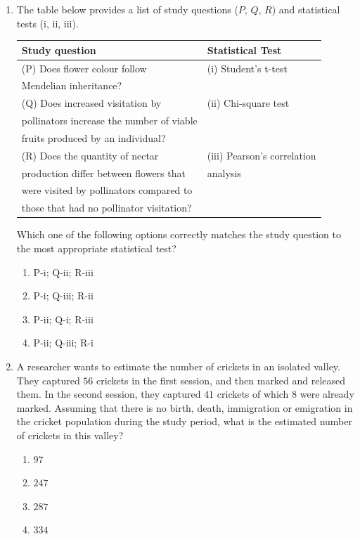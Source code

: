 \documentclass[journal]{IEEEtran}
\begin{document}
\begin{enumerate}
    \item The table below provides a list of study questions 
($P$, $Q$, $R$) and statistical tests (i, ii, iii).
    \begin{center}
    \begin{tabular}{|l|l|}
        \hline
        \textbf{Study question} & \textbf{Statistical Test} \\ \hline
        (P) Does flower colour follow & (i) Student's t-test \\ 
        Mendelian inheritance?
& \\ \hline
        (Q) Does increased visitation by & (ii) Chi-square test \\ 
        pollinators increase the number of viable & \\
        fruits produced by an individual?
& \\ \hline
        (R) Does the quantity of nectar & (iii) Pearson's correlation \\ 
        production differ between flowers that & analysis \\
        were visited by pollinators compared to & \\
        those that had no pollinator visitation?
& \\ \hline
    \end{tabular}
    \end{center}
    Which one of the following options correctly matches the study question to the most appropriate statistical test?
\begin{multicols}{2}
    \begin{enumerate}
        \item P-i; Q-ii;
R-iii
        \item P-i; Q-iii;
R-ii
        \item P-ii; Q-i;
R-iii
        \item P-ii; Q-iii;
R-i
    \end{enumerate}
    \end{multicols}
    
    \item A researcher wants to estimate the number of crickets in an isolated valley.
They captured $56$ crickets in the first session, and then marked and released them.
In the second session, they captured $41$ crickets of which $8$ were already marked.
Assuming that there is no birth, death, immigration or emigration in the cricket population during the study period, what is the estimated number of crickets in this valley?
\begin{multicols}{2}
    \begin{enumerate}
        \item $97$
        \item $247$
        \item $287$
        \item $334$
    \end{enumerate}
    \end{multicols}
    

\end{enumerate}
\end{document}
